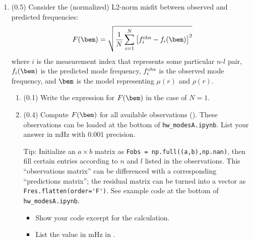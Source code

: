 \documentclass[11pt,titlepage,fleqn]{article}
\newcommand{\tfilemain}{{\tt hw\_modesA.ipynb}}
\begin{document}
\begin{enumerate}
\begin{enumerate}
Note: Some points $(l,\,\fnl)$ will be outside the plotting range.

\item (0.3) On your dispersion diagram, plot the observations in  with a different symbol (or color) from the predictions. (Make sure you plot all predicted frequencies, not just the ones with matching observations.)

Note: See code at the bottom of \tfilemain\ to read in the observations.

\end{enumerate}

\label{prob:disp}


\item (0.5) Consider the (normalized) L2-norm misfit between observed and predicted frequencies:
%
\begin{equation}
F(\bem) = \sqrt{ \frac{1}{N} \sum_{i=1}^N \left[f_i^{\rm obs} - f_i(\bem)\right]^2 }
\label{Fm}
\end{equation}
%
where $i$ is the measurement index that represents some particular $n$-$l$ pair, $f_i(\bem)$ is the predicted mode frequency, $f_i^{\rm obs}$ is the observed mode frequency, and $\bem$ is the model representing $\mu(r)$ and $\rho(r)$.

\begin{enumerate}
\item (0.1) Write the expression for $F(\bem)$ in the case of $N=1$.

\item (0.4) Compute $F(\bem)$ for all available observations (). These observations can be loaded at the bottom of \tfilemain. List your answer in mHz with 0.001 precision.

Tip: Initialize an $a \times b$ matrix as \verb+Fobs = np.full((a,b),np.nan)+, then fill certain entries according to $n$ and $l$ listed in the observations. This ``observations matrix'' can be differenced with a corresponding ``predictions matrix''; the residual matrix can be turned into a vector as \verb+Fres.flatten(order='F')+. See example code at the bottom of \tfilemain.

\begin{itemize}
\item Show your code excerpt for the calculation.
\item List the value in mHz in .
\end{itemize}

\end{enumerate}

\label{prob:Fm}

\end{enumerate}
\end{document}
